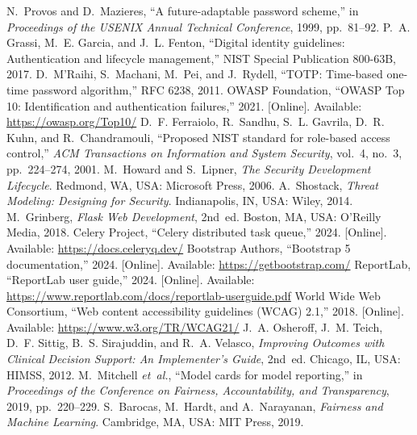 \documentclass[12pt]{article}
\begin{document}
\begin{thebibliography}{00}
 N.~Provos and D.~Mazieres, ``A future-adaptable password scheme,'' in \emph{Proceedings of the USENIX Annual Technical Conference}, 1999, pp.~81--92.
 P.~A. Grassi, M.~E. Garcia, and J.~L. Fenton, ``Digital identity guidelines: Authentication and lifecycle management,'' NIST Special Publication 800-63B, 2017.
 D.~M'Raihi, S.~Machani, M.~Pei, and J.~Rydell, ``TOTP: Time-based one-time password algorithm,'' RFC 6238, 2011.
 OWASP Foundation, ``OWASP Top 10: Identification and authentication failures,'' 2021. [Online]. Available: \url{https://owasp.org/Top10/}
 D.~F. Ferraiolo, R.~Sandhu, S.~L. Gavrila, D.~R. Kuhn, and R.~Chandramouli, ``Proposed NIST standard for role-based access control,'' \emph{ACM Transactions on Information and System Security}, vol.~4, no.~3, pp.~224--274, 2001.
 M.~Howard and S.~Lipner, \emph{The Security Development Lifecycle}. Redmond, WA, USA: Microsoft Press, 2006.
 A.~Shostack, \emph{Threat Modeling: Designing for Security}. Indianapolis, IN, USA: Wiley, 2014.
 M.~Grinberg, \emph{Flask Web Development}, 2nd~ed. Boston, MA, USA: O'Reilly Media, 2018.
 Celery Project, ``Celery distributed task queue,'' 2024. [Online]. Available: \url{https://docs.celeryq.dev/}
 Bootstrap Authors, ``Bootstrap 5 documentation,'' 2024. [Online]. Available: \url{https://getbootstrap.com/}
 ReportLab, ``ReportLab user guide,'' 2024. [Online]. Available: \url{https://www.reportlab.com/docs/reportlab-userguide.pdf}
 World Wide Web Consortium, ``Web content accessibility guidelines (WCAG) 2.1,'' 2018. [Online]. Available: \url{https://www.w3.org/TR/WCAG21/}
 J.~A. Osheroff, J.~M. Teich, D.~F. Sittig, B.~S. Sirajuddin, and R.~A. Velasco, \emph{Improving Outcomes with Clinical Decision Support: An Implementer's Guide}, 2nd~ed. Chicago, IL, USA: HIMSS, 2012.
 M.~Mitchell \emph{et~al.}, ``Model cards for model reporting,'' in \emph{Proceedings of the Conference on Fairness, Accountability, and Transparency}, 2019, pp.~220--229.
 S.~Barocas, M.~Hardt, and A.~Narayanan, \emph{Fairness and Machine Learning}. Cambridge, MA, USA: MIT Press, 2019.
\end{thebibliography}
\end{document}
